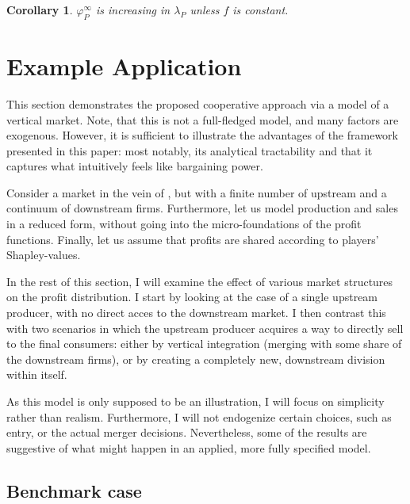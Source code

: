 \documentclass[a4paper]{article}
\newtheorem{corollary}{Corollary}
\begin{document}
\begin{corollary}
    \label{cor:platform_value_multiple_sides_weighted}
    $\varphi_P^\infty$ is increasing in $\lambda_P$ unless $f$ is constant.
\end{corollary}


\section{Example Application}

This section demonstrates the proposed cooperative approach via a model of a vertical market.
Note, that this is not a full-fledged model, and many factors are exogenous.
However, it is sufficient to illustrate the advantages of the framework presented in this paper: most notably, its analytical tractability and that it captures what intuitively feels like bargaining power.

Consider a market in the vein of \textcite{hart1990property}, but with a finite number of upstream and a continuum of downstream firms.
Furthermore, let us model production and sales in a reduced form, without going into the micro-foundations of the profit functions.
Finally, let us assume that profits are shared according to players' Shapley-values.

In the rest of this section, I will examine the effect of various market structures on the profit distribution.
I start by looking at the case of a single upstream producer, with no direct acces to the downstream market.
I then contrast this with two scenarios in which the upstream producer acquires a way to directly sell to the final consumers: either by vertical integration (merging with some share of the downstream firms), or by creating a completely new, downstream division within itself.

As this model is only supposed to be an illustration, I will focus on simplicity rather than realism.
Furthermore, I will not endogenize certain choices, such as entry, or the actual merger decisions.
Nevertheless, some of the results are suggestive of what might happen in an applied, more fully specified model.


\subsection{Benchmark case}
\end{document}
